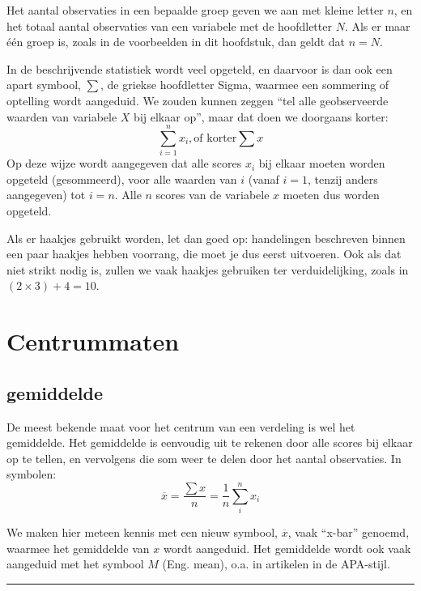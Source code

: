 \documentclass[
]{book}
\begin{document}
Het aantal observaties in een bepaalde groep geven we aan met kleine
letter \(n\), en het totaal aantal observaties van een variabele met de
hoofdletter \(N\). Als er maar één groep is, zoals in de voorbeelden in
dit hoofdstuk, dan geldt dat \(n=N\).

In de beschrijvende statistiek wordt veel opgeteld, en daarvoor is dan
ook een apart symbool, \(\sum\), de griekse hoofdletter Sigma, waarmee een
sommering of optelling wordt aangeduid. We zouden kunnen zeggen ``tel
alle geobserveerde waarden van variabele \(X\) bij elkaar op'', maar dat
doen we doorgaans korter:
\[\sum\limits_{i=1}^n x_i, \textrm{of korter} \sum x
\]
Op deze wijze
wordt aangegeven dat alle scores \(x_i\) bij elkaar moeten worden opgeteld
(gesommeerd), voor alle waarden van \(i\) (vanaf \(i=1\), tenzij anders
aangegeven) tot \(i=n\). Alle \(n\) scores van de variabele \(x\) moeten dus
worden opgeteld.

Als er haakjes gebruikt worden, let dan goed op: handelingen beschreven
binnen een paar haakjes hebben voorrang, die moet je dus eerst
uitvoeren. Ook als dat niet strikt nodig is, zullen we vaak haakjes
gebruiken ter verduidelijking, zoals in \((2\times3)+4=10\).

\section{Centrummaten}\label{centrummaten}

\subsection{gemiddelde}\label{sec:gemiddelde}

De meest bekende maat voor het centrum van een verdeling is wel het
gemiddelde. Het gemiddelde is eenvoudig uit te rekenen door alle scores
bij elkaar op te tellen, en vervolgens die som weer te delen door het
aantal observaties. In symbolen:
\begin{equation} 
  \overline{x} = \frac{\sum x}{n} = \frac{1}{n} \sum\limits_{i}^n x_i
  \label{eq:gemiddelde}
\end{equation}

We maken hier meteen kennis met een nieuw symbool, \(\overline{x}\), vaak
``x-bar'' genoemd, waarmee het gemiddelde van \(x\) wordt aangeduid. Het gemiddelde
wordt ook vaak aangeduid met het symbool \(M\) (Eng. mean), o.a. in
artikelen in de APA-stijl.

\begin{center}\rule{0.5\linewidth}{0.5pt}\end{center}
\end{document}

